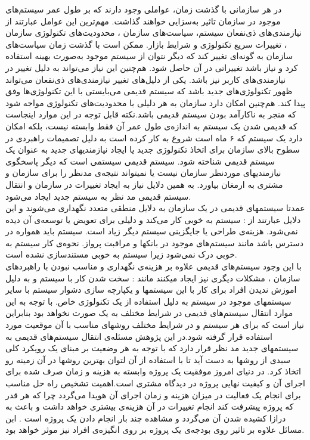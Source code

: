 
در هر سازمانی با گذشت زمان، عواملی وجود دارند که بر طول عمر سیستم‌های موجود در سازمان تاثیر به‌سزایی خواهند گذاشت. مهم‌ترین این عوامل عبارتند از نیازمندی‌های ذی‌نفعان سیستم، سیاست‌های سازمان ، محدودیت‌های تکنولوژی سازمان ، تغییرات سریع تکنولوژی و شرایط بازار. ممکن است با گذشت زمان سیاست‌های سازمان به گونه‌ای تغییر کند که دیگر نتوان از سیستم موجود به‌صورت بهینه استفاده کرد و نیاز باشد تغییراتی در آن حاصل شود. هم‌چنین این نیاز می‌تواند به دلیل تغییر در نیازمندی‌های کاربر نیز باشد. یکی از دلیل‌های تغییر نیازمندی‌های ذی‌نفعان می‌تواند ظهور تکنولوژی‌‌های جدید باشد که سیستم قدیمی می‌بایستی با این تکنولوژی‌ها وفق پیدا کند. هم‌چنین امکان دارد سازمان به هر دلیلی با محدودیت‌های تکنولوژی مواجه شود که منجر به ناکارآمد بودن سیستم قدیمی باشد.نکته قابل توجه در این موارد اینجاست که قدیمی شدن یک سیستم به اندازه‌ی طول عمر آن فقط وابسته نیست، بلکه امکان دارد یک سیستم که ۶ ماه است شروع به کار کرده است به دلیل تصمیمات راهبردی در سطوح بالای سازمان برای اتخاذ تکنولوژی جدید یا ایجاد نیازمندیهای جدید به عنوان یک سیستم قدیمی شناخته شود. سیستم قدیمی سیستمی است که دیگر پاسخگوی نیازمندیهای موردنظر سازمان نیست یا نمیتواند نتیجه‌ی مدنظر را برای سازمان و مشتری به ارمغان بیاورد. به همین دلایل نیاز به ایجاد تغییرات در سازمان و انتقال سیستم قدیمی مد نظر به سیستم جدید ایجاد می‌شود.
\\
عمدتا سیستمهای قدیمی در یک سازمان به دلایل منطقی متعدد نگهداری می‌شوند و این دلایل عبارتند از :
 سیستم به خوبی کار می‌کند و دلیلی برای تعویض یا  توسعه‌ی آن دیده نمی‌شود.
 هزینه‌ی طراحی یا جایگزینی سیستم دیگر زیاد است.
 سیستم باید همواره در دسترس باشد مانند سیستم‌های موجود در بانکها و مراقبت پرواز.
 نحوه‌ی کار سیستم به خوبی درک نمی‌شود  زیرا سیستم به خوبی مستندسازی نشده است. 
\\
با این وجود سیستم‌های قدیمی علاوه بر هزینه‌ی نگهداری   و مناسب نبودن با راهبردهای سازمان ، مشکلات دیگری نیز ایجاد میکنند مانند : سخت شدن کار با سیستم و به دلیل اموزش ندیدن افراد برای کار با این سیستمها و یکپارچه سازی دشوار سیستم با سایر سیستمهای موجود در سیستم به دلیل استفاده از یک  تکنولوژی خاص.
با توجه به این موارد انتقال سیستم‌های قدیمی در شرایط مختلف به یک صورت نخواهد بود بنابراین نیاز است که برای هر سیستم و در شرایط مختلف روشهای  مناسب با آن موقعیت مورد استفاده قرار گرفته شود.در این پژوهش مسئله‌ی انتقال سیستم‌های قدیمی به سیستمهای جدید مد نظر قرار دارد که با توجه به هر وضعیت بر مبنای یک رویکرد کلی سبدی از روشها به دست آید تا با استفاده از آن لتوان بهترین روشها در آن زمینه رو اتخاذ کرد.
در دنیای امروز موفقیت یک پروژه وابسته به هزینه و زمان صرف شده برای اجرای آن و کیفیت نهایی پروژه در دیدگاه مشتری است.اهمیت تشخیص راه حل مناسب برای انجام یک فعالیت در میزان هزینه و زمان اجرای آن هویدا می‌گردد چرا که هر قدر که پروژه پیشرفت کند انجام تغییرات در آن هزینه‌ی بیشتری خواهد داشت و باعث به درازا کشیده شدن آن می‌گردد و مشاهده چند بار انجام دادن یک پروژه است . ابن مسائل علاوه بر تاثیر روی بودجه‌ی یک پروژه بر روی انگیزه‌ی افراد نیز موثر خواهد بود.
